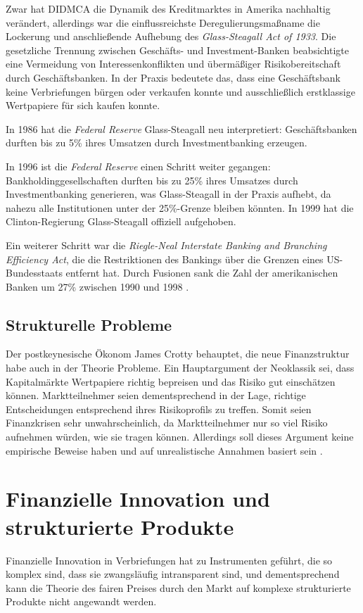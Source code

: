 \documentclass[a4paper,draft,11pt]{report}
\begin{document}
Zwar hat DIDMCA die Dynamik des Kreditmarktes in Amerika nachhaltig
ver\"andert, allerdings war die einflussreichste Deregulierungsmaßname
die Lockerung und anschließende Aufhebung des
\textit{Glass-Steagall Act of 1933}.
Die gesetzliche Trennung zwischen Geschäfts- und Investment-Banken
beabsichtigte eine Vermeidung von Interessenkonflikten und 
\"uberm\"aßiger Risikobereitschaft durch Geschäftsbanken.
In der Praxis bedeutete das, dass eine Gesch\"aftsbank keine 
Verbriefungen b\"urgen oder verkaufen konnte und ausschließlich
erstklassige Wertpapiere f\"ur sich kaufen konnte.

In 1986 hat die \textit{Federal Reserve} Glass-Steagall neu interpretiert:
Geschäftsbanken durften bis zu 5\% ihres Umsatzen durch Investmentbanking
erzeugen.

In 1996 ist die \textit{Federal Reserve} einen Schritt weiter gegangen:
Bankholdinggesellschaften durften bis zu 25\% ihres Umsatzes durch
Investmentbanking generieren, was Glass-Steagall in der Praxis aufhebt,
da nahezu alle Institutionen unter der 25\%-Grenze bleiben k\"onnten.
In 1999 hat die Clinton-Regierung Glass-Steagall offiziell aufgehoben.

Ein weiterer Schritt war die \textit{
  Riegle-Neal  Interstate  Banking  and  Branching Efficiency Act}, die
die Restriktionen des Bankings \"uber die Grenzen eines US-Bundesstaats
entfernt hat. Durch Fusionen sank die Zahl der amerikanischen 
Banken um 27\% zwischen 1990 und 1998 \parencite[8--12]{sherman2009short}.

\subsection{Strukturelle Probleme}
Der postkeynesische \"Okonom James Crotty behauptet, die neue Finanzstruktur
habe auch in der Theorie Probleme. Ein Hauptargument der Neoklassik sei, dass
Kapitalm\"arkte Wertpapiere richtig bepreisen und das Risiko gut einsch\"atzen
k\"onnen. Marktteilnehmer seien dementsprechend in der Lage,
richtige Entscheidungen entsprechend ihres Risikoprofils zu treffen.
Somit seien Finanzkrisen sehr unwahrscheinlich, da Marktteilnehmer nur so viel
Risiko aufnehmen w\"urden, wie sie tragen k\"onnen. Allerdings soll dieses Argument
keine empirische Beweise haben und auf unrealistische Annahmen basiert sein 
\parencite[563--565]{crottycam}.

\section{Finanzielle Innovation und strukturierte Produkte}
Finanzielle Innovation in Verbriefungen hat zu Instrumenten gef\"uhrt,
die so komplex sind, dass sie zwangsl\"aufig intransparent sind, und dementsprechend
kann die Theorie des fairen Preises durch den Markt auf komplexe strukturierte Produkte
nicht angewandt werden.
\end{document}
